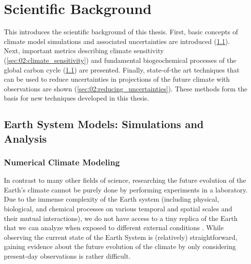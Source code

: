 
%



\chapter{Scientific Background}
\label{ch:02:scientific_background}

This  introduces the scientific
background of this thesis. First, basic concepts of climate model simulations
and associated uncertainties are introduced (\cref{sec:02:esms}). Next,
important metrics describing climate sensitivity
(\cref{sec:02:climate_sensitivity}) and fundamental biogeochemical processes of
the global carbon cycle (\cref{sec:02:esms}) are presented. Finally,
state-of-the art techniques that can be used to reduce uncertainties in
projections of the future climate with observations are shown
(\cref{sec:02:reducing_uncertainties}). These methods form the basis for new
techniques developed in this thesis.


\section{Earth System Models: Simulations and Analysis}
\label{sec:02:esms}


\subsection{Numerical Climate Modeling}
\label{subsec:02:numerical_climate_modeling}

In contrast to many other fields of science, researching the future evolution
of the Earth's climate cannot be purely done by performing experiments in a
laboratory. Due to the immense complexity of the Earth system (including
physical, biological, and chemical processes on various temporal and spatial
scales and their mutual interactions), we do not have access to a tiny replica
of the Earth that we can analyze when exposed to different external conditions
\autocite{Flato2011}. While observing the current state of the Earth System is
(relatively) straightforward, gaining evidence about the future evolution of
the climate by only considering present-day observations is rather difficult.

